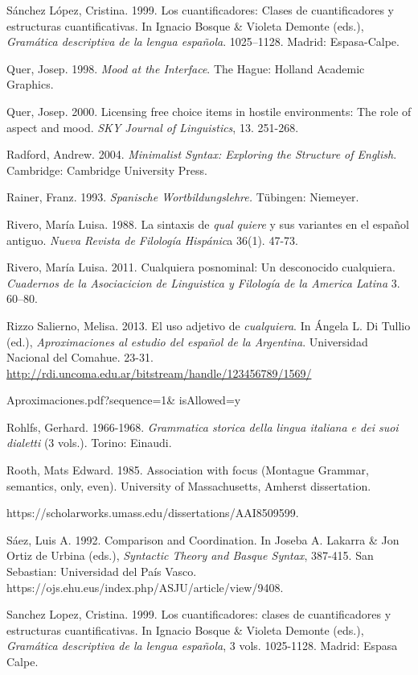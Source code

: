 \documentclass[output=paper]{langscibook}
\begin{document}
Sánchez López, Cristina. 1999. Los cuantificadores: Clases de cuantificadores y estructuras cuantificativas. In Ignacio Bosque \& Violeta Demonte (eds.), \textit{Gramática descriptiva de la lengua española}. 1025–1128. Madrid: Espasa-Calpe.

Quer, Josep. 1998. \textit{Mood at the Interface}. The Hague: Holland Academic Graphics.

Quer, Josep. 2000. Licensing free choice items in hostile environments: The role of aspect and mood. \textit{SKY Journal of Linguistics}, 13. 251-268.

Radford, Andrew. 2004. \textit{Minimalist Syntax: Exploring the Structure of English}. Cambridge: Cambridge University Press.

Rainer, Franz. 1993. \textit{Spanische Wortbildungslehre.} Tübingen: Niemeyer.

Rivero, María Luisa. 1988. La sintaxis de \textit{qual} \textit{quiere} y sus variantes en el español antiguo. \textit{Nueva Revista de Filología} \textit{Hispánic}a 36(1). 47-73.

Rivero, María Luisa. 2011. Cualquiera posnominal: Un desconocido cualquiera. \textit{Cuadernos de la Asociacicion de Linguistica y Filología de la America Latina} 3. 60–80.

Rizzo Salierno, Melisa. 2013. El uso adjetivo de \textit{cualquiera}. In Ángela L. Di Tullio (ed.), \textit{Aproximaciones al estudio del español de la Argentina}. Universidad Nacional del Comahue. 23-31. \url{http://rdi.uncoma.edu.ar/bitstream/handle/123456789/1569/}

  Aproximaciones.pdf?sequence=1\& isAllowed=y

Rohlfs, Gerhard. 1966-1968. \textit{Grammatica storica della lingua italiana e dei suoi dialetti} (3 vols.). Torino: Einaudi. 

Rooth, Mats Edward. 1985. Association with focus (Montague Grammar, semantics, only, even). University of Massachusetts, Amherst dissertation.~

  https://scholarworks.umass.edu/dissertations/AAI8509599.

Sáez, Luis A. 1992. Comparison and Coordination. In Joseba A. Lakarra \& Jon Ortiz de Urbina (eds.), \textit{Syntactic Theory and Basque Syntax}, 387-415. San Sebastian: Universidad del País Vasco. https://ojs.ehu.eus/index.php/ASJU/article/view/9408.

Sanchez Lopez, Cristina. 1999. Los cuantificadores: clases de cuantificadores y estructuras cuantificativas. In Ignacio Bosque \& Violeta Demonte (eds.), \textit{Gramática descriptiva de la lengua española}, 3 vols. 1025-1128. Madrid: Espasa Calpe.
\end{document}
